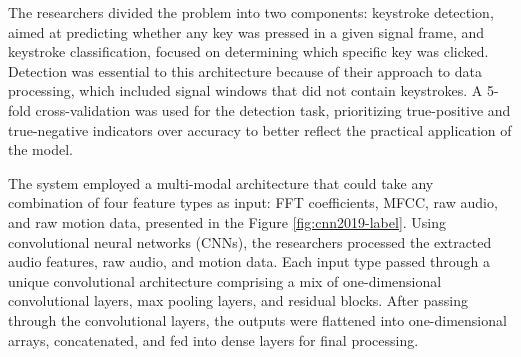 \documentclass[a4paper,11pt,twoside]{report}
\theoremstyle{definition}
\begin{document}
The researchers divided the problem into two components: keystroke detection, aimed at predicting whether any key was pressed in a given signal frame, and keystroke classification, focused on determining which specific key was clicked. Detection was essential to this architecture because of their approach to data processing, which included signal windows that did not contain keystrokes. A 5-fold cross-validation was used for the detection task, prioritizing true-positive and true-negative indicators over accuracy to better reflect the practical application of the model.

The system employed a multi-modal architecture that could take any combination of four feature types as input: FFT coefficients, MFCC, raw audio, and raw motion data, presented in the Figure \ref{fig:cnn2019-label}. Using convolutional neural networks (CNNs), the researchers processed the extracted audio features, raw audio, and motion data. Each input type passed through a unique convolutional architecture comprising a mix of one-dimensional convolutional layers, max pooling layers, and residual blocks. After passing through the convolutional layers, the outputs were flattened into one-dimensional arrays, concatenated, and fed into dense layers for final processing.
\end{document}
